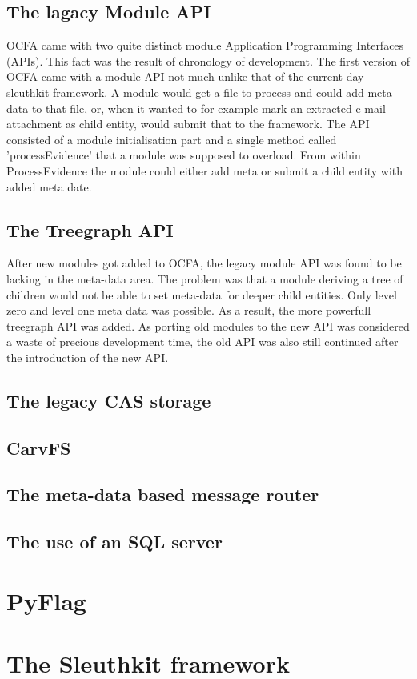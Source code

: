\subsection{The lagacy Module API}
OCFA came with two quite distinct module Application Programming Interfaces (APIs). This fact was the result of chronology of development. The first version of OCFA came with a module API not much unlike that of the current day sleuthkit framework. A module would get a file to process and could add meta data to that file, or, when it wanted to for example mark an extracted e-mail attachment as child entity, would submit that to the framework. The API consisted of a module initialisation part and a single method called 'processEvidence' that a module was supposed to overload. From within ProcessEvidence the module could either add meta or submit a child entity with added meta date.
\subsection{The Treegraph API}
After new modules got added to OCFA, the legacy module API was found to be lacking in the meta-data area. The problem was that a module deriving a tree of children would not be able to set meta-data for deeper child entities. Only level zero and level one meta data was possible. As a result, the more powerfull treegraph API was added. As porting old modules to the new API was considered a waste of precious development time, the old API was also still continued after the introduction of the new API.
\subsection{The legacy CAS storage}
\subsection{CarvFS}
\subsection{The meta-data based message router}
\subsection{The use of an SQL server}
\section{PyFlag}
\section{The Sleuthkit framework}
